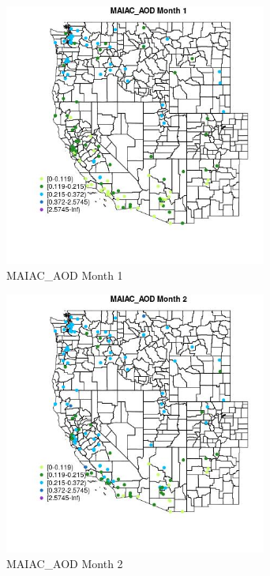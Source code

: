 \begin{figure} 
\centering  
\includegraphics[width=0.77\textwidth]{Code_Outputs/Report_ML_input_PM25_Step4_part_e_de_duplicated_aves_MapObsMo1MAIAC_AOD.jpg} 
\caption{\label{fig:Report_ML_input_PM25_Step4_part_e_de_duplicated_avesMapObsMo1MAIAC_AOD}MAIAC_AOD Month 1} 
\end{figure} 
 

\begin{figure} 
\centering  
\includegraphics[width=0.77\textwidth]{Code_Outputs/Report_ML_input_PM25_Step4_part_e_de_duplicated_aves_MapObsMo2MAIAC_AOD.jpg} 
\caption{\label{fig:Report_ML_input_PM25_Step4_part_e_de_duplicated_avesMapObsMo2MAIAC_AOD}MAIAC_AOD Month 2} 
\end{figure} 
 

